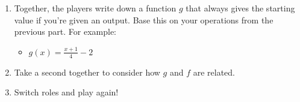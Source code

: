 \documentclass[noauthor]{ximera}
\begin{document}
\begin{enumerate}
    used to determine those \(x\)-values. For example:
    \begin{itemize}
        \item Add 1, divide by 4, subtract 2
    \end{itemize}
    \item Together, the players write down a function \(g\) that always gives the 
    starting value if you're given an output. Base this on your operations
    from the previous part. For example:
    \begin{itemize}
        \item \(g(x) = \frac{x + 1}{4} - 2\)
    \end{itemize}
    \item Take a second together to consider how \(g\) and \(f\) are related. 
    \item Switch roles and play again!
\end{enumerate}
\end{document}
